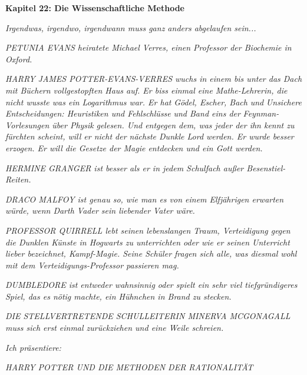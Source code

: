 

\hypertarget{die-wissenschaftliche-methode}{%

\textbf{Kapitel 22: Die Wissenschaftliche Methode\\ }

\hfill\break

\emph{\emph{Irgendwas, irgendwo, irgendwann muss ganz anders abgelaufen sein...}}

\hfill\break \emph{PETUNIA EVANS heiratete Michael Verres, einen Professor der Biochemie in Oxford.}

\emph{HARRY JAMES POTTER-EVANS-VERRES wuchs in einem bis unter das Dach mit Büchern vollgestopften Haus auf. Er biss einmal eine Mathe-Lehrerin, die nicht wusste was ein Logarithmus war. Er hat} \emph{\emph{Gödel, Escher, Bach}} \emph{und} \emph{\emph{Unsichere Entscheidungen: Heuristiken und Fehlschlüsse}} \emph{und Band eins der} \emph{\emph{Feynman-Vorlesungen über Physik}} \emph{gelesen. Und entgegen dem, was jeder der ihn kennt zu fürchten scheint, will er nicht der nächste Dunkle Lord werden. Er wurde besser erzogen. Er will die Gesetze der Magie entdecken und ein Gott werden.}

\emph{HERMINE GRANGER ist besser als er in jedem Schulfach außer Besenstiel-Reiten.}

\emph{DRACO MALFOY ist genau so, wie man es von einem Elfjährigen erwarten würde, wenn Darth Vader sein liebender Vater wäre.}

\emph{PROFESSOR QUIRRELL lebt seinen lebenslangen Traum, Verteidigung gegen die Dunklen Künste in Hogwarts zu unterrichten oder wie er seinen Unterricht lieber bezeichnet, Kampf-Magie. Seine Schüler fragen sich alle, was diesmal wohl mit dem Verteidigungs-Professor passieren mag.}

\emph{DUMBLEDORE ist entweder wahnsinnig oder spielt ein sehr viel tiefgründigeres Spiel, das es nötig machte, ein Hühnchen in Brand zu stecken.}

\emph{DIE STELLVERTRETENDE SCHULLEITERIN MINERVA MCGONAGALL muss sich erst einmal zurückziehen und eine Weile schreien.}

\emph{Ich präsentiere:}

\hfill\break

\emph{HARRY POTTER UND DIE METHODEN DER RATIONALITÄT}

}
